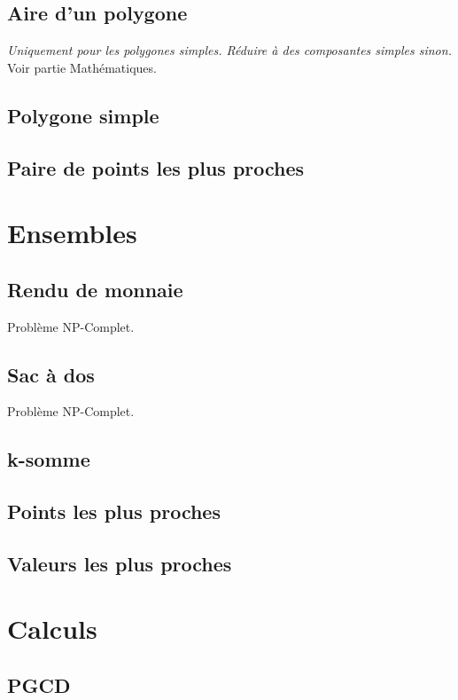 \documentclass[8pt]{article}
\begin{document}
        \subsection{Aire d'un polygone}
        \textit{Uniquement pour les polygones simples. Réduire à des composantes simples sinon.}
        Voir partie Mathématiques.
        {\scriptsize}
        \subsection{Polygone simple}
        {\scriptsize}
        \subsection{Paire de points les plus proches}
    \section{Ensembles}
        \subsection{Rendu de monnaie}
        Problème NP-Complet.
        {\scriptsize}
        \subsection{Sac à dos}
        Problème NP-Complet.
        {\scriptsize}
        \subsection{k-somme}
        \subsection{Points les plus proches}
        {\scriptsize}
        \subsection{Valeurs les plus proches}
        {\scriptsize}
    \section{Calculs}
        \subsection{PGCD}
        {\scriptsize}
\end{document}
